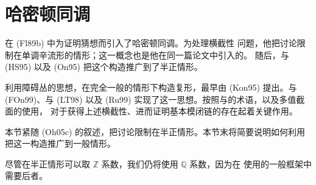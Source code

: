 \chapter{哈密顿\personFloer{}同调}
\label{ch:hamiltonian-floer}

\personFloer{}在 (Fl89b) 中为证明\personArnold{}猜想而引入了哈密顿\personFloer{}同调。为处理横截性
问题，他把讨论限制在单调辛流形的情形；这一概念也是他在同一篇论文中引入的。
随后，\personHofer{}与\personSalamon{} (HS95) 以及\personOno{} (On95) 把这个构造推广到了半正情形。

利用障碍丛的思想，在完全一般的情形下构造\personFloer{}复形，最早由\personKontsevich{}
(Kon95) 提出。\personFukaya{}与\personOno{} (FOn99)、\personLiu{}与\personGangTian{} (LT98) 以及\personYongbinRuan{} (Ru99)
实现了这一思想。按照\personFukaya{}与\personOno{}的术语，\termKuranishiStructure{}以及多值截面的使用，
对于获得上述横截性、进而证明基本模闭链的存在起着关键作用。

本节紧随 (Oh05c) 的叙述，把讨论限制在半正情形。本节末将简要说明如何利用\termKuranishiStructure{}把这一构造推广到一般情形。

尽管在半正情形可以取 $\mathbb Z$ 系数，我们仍将使用 $\mathbb Q$ 系数，因为在
使用\termKuranishiStructure{}的一般框架中需要后者。









